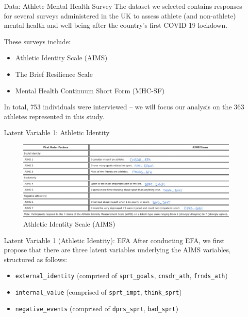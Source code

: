 \documentclass[
  ignorenonframetext,
]{beamer}
\providecommand{\tightlist}{%
  \setlength{\itemsep}{0pt}\setlength{\parskip}{0pt}}
\begin{document}
\begin{frame}{Data: Athlete Mental Health Survey}
\protect\hypertarget{data-athlete-mental-health-survey}{}
The dataset we selected contains responses for several surveys
administered in the UK to assess athlete (and non-athlete) mental health
and well-being after the country's first COVID-19 lockdown.

These surveys include:

\begin{itemize}
\item
  Athletic Identity Scale (AIMS)
\item
  The Brief Resilience Scale
\item
  Mental Health Continuum Short Form (MHC-SF)
\end{itemize}

In total, 753 individuals were interviewed -- we will focus our analysis
on the 363 athletes represented in this study.
\end{frame}

\begin{frame}{Latent Variable 1: Athletic Identity}
\protect\hypertarget{latent-variable-1-athletic-identity}{}
\begin{figure}
\centering
\includegraphics{images/aims_annotated.jpg}
\caption{Athletic Identity Scale (AIMS)}
\end{figure}
\end{frame}

\begin{frame}[fragile]{Latent Variable 1 (Athletic Identity): EFA}
\protect\hypertarget{latent-variable-1-athletic-identity-efa}{}
After conducting EFA, we first propose that there are three latent
variables underlying the AIMS variables, structured as follows:

\begin{itemize}
\tightlist
\item
  \texttt{external\_identity} (comprised of \texttt{sprt\_goals},
  \texttt{cnsdr\_ath}, \texttt{frnds\_ath})
\item
  \texttt{internal\_value} (comprised of \texttt{sprt\_impt},
  \texttt{think\_sprt})
\item
  \texttt{negative\_events} (comprised of \texttt{dprs\_sprt},
  \texttt{bad\_sprt})
\end{itemize}
\end{frame}
\end{document}
